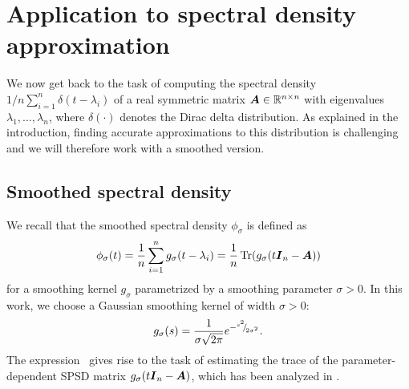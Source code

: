 
\section{Application to spectral density approximation}
\label{sec:application}

We now get back to the task of computing the spectral density $1/n \sum_{i=1}^{n} \delta(t - \lambda_i)$ of a real symmetric matrix $\boldsymbol{A} \in \mathbb{R}^{n \times n}$ with eigenvalues $\lambda_1, \dots, \lambda_n$, where $\delta(\cdot)$ denotes the Dirac delta distribution. As explained in the introduction, finding accurate approximations to this distribution is challenging and we will therefore work with
a smoothed version. %

\subsection{Smoothed spectral density}
\label{subsec:spectral-density}

We recall that the smoothed spectral density $\phi_{\sigma}$ is defined as
\begin{equation}
    \phi_{\sigma}(t) = \frac{1}{n} \sum_{i=1}^{n} g_{\sigma}(t - \lambda_i) = \frac{1}{n} \operatorname{Tr}(g_{\sigma}(t\boldsymbol{I}_n - \boldsymbol{A}))
    \label{equ:smooth-spectral-density}
\end{equation}
for a smoothing kernel $g_{\sigma}$ parametrized by a smoothing parameter $\sigma > 0$. In this work, we choose a Gaussian smoothing kernel of width $\sigma > 0$:
\begin{equation}
    g_{\sigma}(s) = \frac{1}{\sigma \sqrt{2\pi}} e^{-{}^{s^2}{\mskip -5mu/\mskip -3mu}_{2\sigma^2}}.
    \label{equ:smoothing-kernel}
\end{equation}
The expression~ gives rise to the task of estimating the trace of the parameter-dependent SPSD matrix $g_{\sigma}(t\boldsymbol{I}_n - \boldsymbol{A})$, which has been analyzed in .


